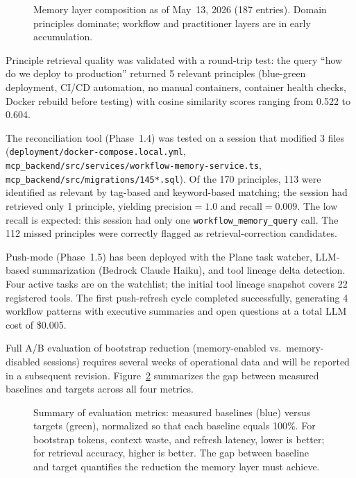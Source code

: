 \documentclass[11pt]{article}
\begin{document}
\begin{figure}[t]
\centering

\caption{Memory layer composition as of May~13, 2026 (187 entries). Domain principles dominate; workflow and practitioner layers are in early accumulation.}
\label{fig:memory-composition}
\end{figure}

Principle retrieval quality was validated with a round-trip test: the query ``how do we deploy to production'' returned 5 relevant principles (blue-green deployment, CI/CD automation, no manual containers, container health checks, Docker rebuild before testing) with cosine similarity scores ranging from 0.522 to 0.604.

The reconciliation tool (Phase~1.4) was tested on a session that modified 3 files (\texttt{deployment/docker-compose.local.yml}, \texttt{mcp\_backend/src/services/workflow-memory-service.ts}, \texttt{mcp\_backend/src/migrations/145*.sql}).
Of the 170 principles, 113 were identified as relevant by tag-based and keyword-based matching; the session had retrieved only 1 principle, yielding precision${}=1.0$ and recall${}=0.009$.
The low recall is expected: this session had only one \texttt{workflow\_memory\_query} call.
The 112 missed principles were correctly flagged as retrieval-correction candidates.

Push-mode (Phase~1.5) has been deployed with the Plane task watcher, LLM-based summarization (Bedrock Claude Haiku), and tool lineage delta detection.
Four active tasks are on the watchlist; the initial tool lineage snapshot covers 22 registered tools.
The first push-refresh cycle completed successfully, generating 4 workflow patterns with executive summaries and open questions at a total LLM cost of \$0.005.

Full A/B evaluation of bootstrap reduction (memory-enabled vs.\ memory-disabled sessions) requires several weeks of operational data and will be reported in a subsequent revision. Figure~\ref{fig:metrics-summary} summarizes the gap between measured baselines and targets across all four metrics.

\begin{figure}[t]
\centering

\caption{Summary of evaluation metrics: measured baselines (blue) versus targets (green), normalized so that each baseline equals 100\%. For bootstrap tokens, context waste, and refresh latency, lower is better; for retrieval accuracy, higher is better. The gap between baseline and target quantifies the reduction the memory layer must achieve.}
\label{fig:metrics-summary}
\end{figure}
\end{document}
